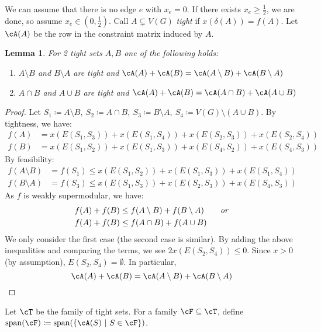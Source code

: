 \documentclass[11pt, a4paper]{article}
\newcommand{\mr}[1]{\mathrm{#1}}
\newcommand{\set}[1]{\{#1\}}
\newtheorem{lemma}[theorem]{Lemma}
\theoremstyle{remark}
\theoremstyle{definition}
\begin{document}
We can assume that there is no edge $e$ with $x_e=0$. If there exists
$x_e\geq\frac{1}{2}$, we are done, so assume $x_e\in(0,\frac{1}{2})$.
Call $A\subsetneq V(G)$ \emph{tight} if $x(\delta(A))=f(A)$. Let
$\cA(A)$ be the row in the constraint matrix induced by $A$.

\begin{lemma}\label{lemma:jain-2-tight-sets}
	For 2 tight sets $A,B$ one of the following holds:
	\begin{enumerate}
		\item $A\setminus B$ and $B\setminus A$ are tight and
		$\cA(A)+\cA(B)=\cA(A\setminus B)+\cA(B\setminus A)$

		\item $A\cap B$ and $A\cup B$ are tight and
		$\cA(A)+\cA(B)=\cA(A\cap B)+\cA(A\cup B)$
	\end{enumerate}
\end{lemma}
\begin{proof}
	Let $S_1\coloneqq A\setminus B,\ S_2\coloneqq A\cap B,\ S_3\coloneqq
		B\setminus A,\ S_4\coloneqq V(G)\setminus(A\cup B)$. By tightness,
	we have:
	\begin{align*}
		f(A) & =x(E(S_1,S_3))+x(E(S_1,S_4))+x(E(S_2,S_3))+x(E(S_2,S_4)) \\
		f(B) & =x(E(S_1,S_2))+x(E(S_1,S_3))+x(E(S_4,S_2))+x(E(S_4,S_3))
	\end{align*}
	By feasibility:
	\begin{align*}
		f(A\setminus B) & =f(S_1)\leq x(E(S_1,S_2))+x(E(S_1,S_3))+x(E(S_1,S_4)) \\
		f(B\setminus A) & =f(S_3)\leq x(E(S_1,S_3))+x(E(S_2,S_3))+x(E(S_4,S_3))
	\end{align*}
	As $f$ is weakly supermodular, we have:
	\begin{align*}
		f(A)+f(B) & \leq f(A\setminus B)+f(B\setminus A) \qquad\text{\emph{or}} \\
		f(A)+f(B) & \leq f(A\cap B)+f(A\cup B)
	\end{align*}
	We only consider the first case (the second case is similar). By adding
	the above inequalities and comparing the terms, we see $2x(E(S_2,S_4))
		\leq0$. Since $x>0$ (by assumption), $E(S_2,S_4)=\emptyset$. In particular,
	\[\cA(A)+\cA(B)=\cA(A\setminus B)+\cA(B\setminus A)\]
\end{proof}

Let $\cT$ be the family of tight sets. For a family
$\cF\subseteq\cT$, define
$\mr{span}(\cF)\coloneqq\mr{span}(\set{\cA(S)\ |\ S\in\cF})$.
\end{document}
